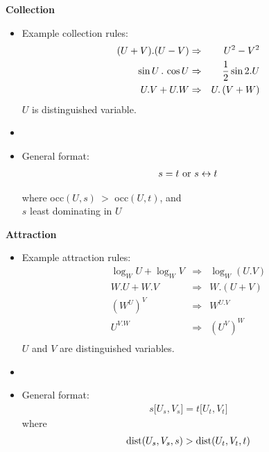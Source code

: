 % 
%
%
\centerline{\huge \bf Collection}
\begin{LARGE}
\begin{itemize}
\item [] Example collection rules:
\begin{eqnarray*}
(U+V).(U-V) & \Rightarrow &U^{2}-V^{2} \\
\sin U\,.\,\cos U & \Rightarrow & {1 \over 2}\sin 2.U \\
U.V+U.W & \Rightarrow & U.\,(V+W) \\
\end{eqnarray*}
\subitem $U$ is distinguished variable.
\item []
\item [] General format:
\begin{eqnarray*}
s=t \hbox{ or } s\leftrightarrow t \\
\end{eqnarray*}
\begin{center}
where occ$(U,s)\ >$ occ$(U,t)$, and \\
$s$ least dominating in $U$\\
\end{center}
\end{itemize}
\end{LARGE}
\newpage

%
%
%

\centerline{ \huge \bf Attraction}
\begin{LARGE}
\begin{itemize}
\item [] Example attraction rules:
\begin{eqnarray*}
\log_{W}U+\log_{W}V & \Rightarrow & \log_{W}(U.V) \\
W.U+W.V & \Rightarrow & W.(U+V) \\
(W^{U})^{V} & \Rightarrow & W^{U.V} \\
U^{V.W} & \Rightarrow & (U^V)^W \\
\end{eqnarray*}
\subitem $U$ and $V$ are distinguished variables.
\item []
\item [] General format:
\begin{eqnarray*}
s\lbrack U_{s},V_{s} \rbrack = t\lbrack U_{t},V_{t} \rbrack
\end{eqnarray*}
where
\begin{eqnarray*}
{\rm dist}(U_{s},V_{s},s)>{\rm dist}(U_{t},V_{t},t)
\end{eqnarray*}
\end{itemize}
\end{LARGE}
\newpage


